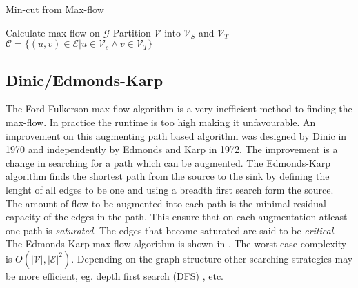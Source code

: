 \begin{algorithm}[!t]
	\caption{Min-cut from Max-flow}\label{alg:graphsegmentation}
	\begin{algorithmic}[1]
		\State Calculate max-flow on $\mathcal{G}$
		\State Partition $\mathcal{V}$ into $\mathcal{V}_S$ and $\mathcal{V}_T$
		\State $\mathcal{C} = \{ (u,v) \in \mathcal{E} | u \in \mathcal{V}_s \wedge v \in \mathcal{V}_T \}$
	\end{algorithmic}
\end{algorithm}


\subsection{Dinic/Edmonds-Karp}
\label{sec:Dinic}

The Ford-Fulkerson max-flow algorithm is a very inefficient method to finding the max-flow. In practice the runtime is too high making it unfavourable. An improvement on this augmenting path based algorithm was designed by Dinic\citep{Dinic1970} in 1970 and independently by Edmonds and Karp\citep{Edmonds1972} in 1972. The improvement is a change in searching for a path which can be augmented. The Edmonds-Karp algorithm finds the shortest path from the source to the sink by defining the lenght of all edges to be one and using a breadth first search form the source. The amount of flow to be augmented into each path is the minimal residual capacity of the edges in the path. This ensure that on each augmentation atleast one path is \textit{saturated}. The edges that become saturated are said to be \textit{critical}. The Edmonds-Karp max-flow algorithm is shown in . The worst-case complexity is $O(|\mathcal{V}|,|\mathcal{E}|^2)$. Depending on the graph structure other searching strategies may be more efficient, eg. depth first search (DFS) \citep{Cormen2009}, etc.

